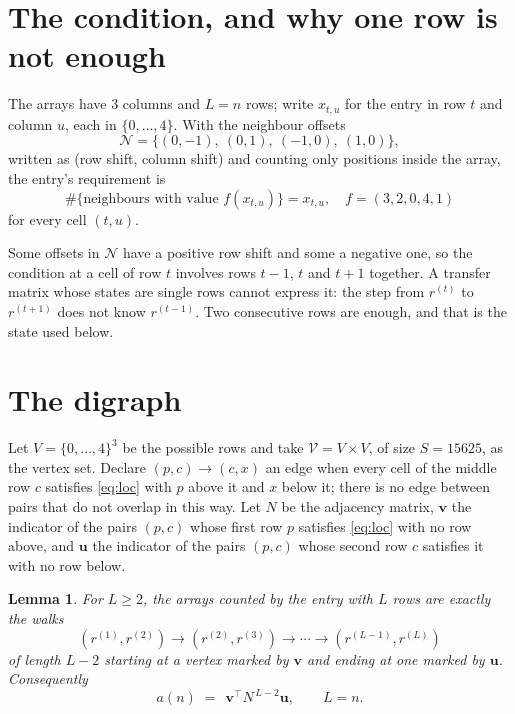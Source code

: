 \documentclass[11pt,a4paper]{article}
\theoremstyle{plain}
\newtheorem{lemma}[theorem]{Lemma}
\theoremstyle{definition}
\begin{document}
\section{The condition, and why one row is not enough}

The arrays have $3$ columns and $L=n$ rows; write $x_{t,u}$ for the entry in
row $t$ and column $u$, each in $\{0,\dots,4\}$. With the neighbour offsets
\[
\mathcal N=\{(0,-1),\ (0,1),\ (-1,0),\ (1,0)\},
\]
written as (row shift, column shift) and counting only positions inside the array, the
entry's requirement is
\begin{equation}\label{eq:loc}
\#\{\text{neighbours with value }f(x_{t,u})\}=x_{t,u},\quad f=(3,2,0,4,1)
\end{equation}
for every cell $(t,u)$.

Some offsets in $\mathcal N$ have a positive row shift and some a negative one, so the
condition at a cell of row $t$ involves rows $t-1$, $t$ and $t+1$ together. A transfer
matrix whose states are single rows cannot express it: the step from $r^{(t)}$ to
$r^{(t+1)}$ does not know $r^{(t-1)}$. Two consecutive rows are enough, and that is
the state used below.

\section{The digraph}

Let $V=\{0,\dots,4\}^{3}$ be the possible rows and take
$\mathcal V=V\times V$, of size $S=15625$, as the vertex set. Declare $(p,c)\to(c,x)$ an edge
when every cell of the middle row $c$ satisfies \eqref{eq:loc} with $p$ above it and $x$
below it; there is no edge between pairs that do not overlap in this way. Let $N$ be the
adjacency matrix, $\mathbf{v}$ the indicator of the pairs $(p,c)$ whose first row $p$
satisfies \eqref{eq:loc} with no row above, and $\mathbf{u}$ the indicator of
the pairs $(p,c)$ whose second row $c$ satisfies it with no row below.

\begin{lemma}\label{lem:walk}
For $L\ge2$, the arrays counted by the entry with $L$ rows are exactly the walks
\[
(r^{(1)},r^{(2)})\to(r^{(2)},r^{(3)})\to\cdots\to(r^{(L-1)},r^{(L)})
\]
of length $L-2$ starting at a vertex marked by $\mathbf{v}$ and ending at one marked by
$\mathbf{u}$. Consequently
\[
a(n)\;=\;\,\mathbf{v}^{\!\top}N^{\,L-2}\mathbf{u},\qquad L=n .
\]
\end{lemma}
\end{document}
